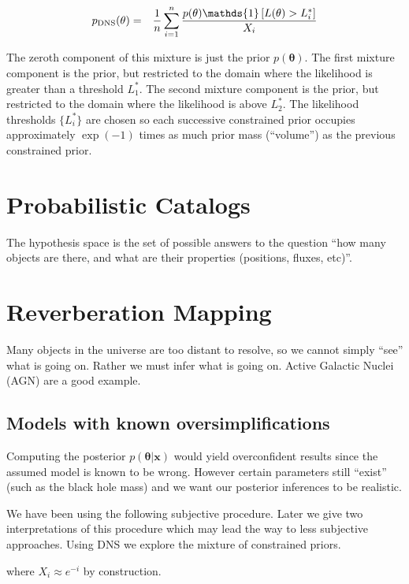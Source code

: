 \documentclass[
  ,final            %
  ]
  {aipproc}
\newcommand{\pars}{\boldsymbol{\theta}}
\newcommand{\data}{\mathbf{x}}
\begin{document}
\begin{eqnarray}
p_{\rm DNS}(\theta) &=& \frac{1}{n}\sum_{i=1}^n
\frac{p(\theta)\mathds{1}\left[L(\theta) > L^*_i\right]}{X_i}
\end{eqnarray}

The zeroth component of this mixture is just the prior $p(\pars)$. The first
mixture component is the prior, but restricted to the domain where the
likelihood is greater than a threshold $L^*_1$. The second mixture component
is the prior, but restricted to the domain where the likelihood is above
$L^*_2$. The likelihood thresholds $\{ L^*_i \}$ are chosen so each
successive constrained prior occupies approximately $\exp(-1)$ times as much
prior mass (``volume'') as the previous constrained prior.

\section{Probabilistic Catalogs}
The hypothesis space is the set of possible answers to the question
``how many objects are there, and what are their properties (positions, fluxes,
etc)''.


\section{Reverberation Mapping}
Many objects in the universe are too distant to resolve, so we cannot simply
``see'' what is going on. Rather we must infer what is going on. Active Galactic
Nuclei (AGN) are a good example.

\subsection{Models with known oversimplifications}
Computing the posterior $p(\pars | \data)$ would yield overconfident results
since the assumed model is known to be wrong. However certain parameters still
``exist'' (such as the black hole mass) and we want our posterior inferences
to be realistic.

We have been using the following subjective procedure. Later we give two
interpretations of this procedure which may lead the way to less subjective
approaches.
Using DNS we explore the mixture of constrained priors.

where $X_i \approx e^{-i}$ by construction.

\end{document}
